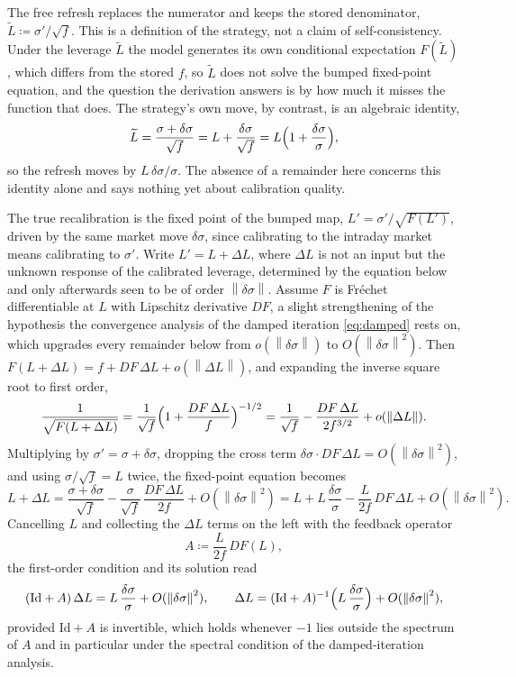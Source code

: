 \documentclass[11pt,a4paper]{article}
\theoremstyle{plain}
\theoremstyle{definition}
\theoremstyle{definition}
\newcommand{\norm}[1]{\left\lVert #1 \right\rVert}
\newcommand{\Lev}{L}
\newcommand{\Id}{\mathrm{Id}}
\begin{document}
The free refresh replaces the numerator and keeps the stored denominator, $\widetilde{\Lev} \coloneqq \sigma'/\sqrt{f}$. This is a definition of the strategy, not a claim of self-consistency. Under the leverage $\widetilde{\Lev}$ the model generates its own conditional expectation $F(\widetilde{\Lev})$, which differs from the stored $f$, so $\widetilde{\Lev}$ does not solve the bumped fixed-point equation, and the question the derivation answers is by how much it misses the function that does. The strategy's own move, by contrast, is an algebraic identity,
\[
  \widetilde{\Lev} = \frac{\sigma + \delta\sigma}{\sqrt{f}} = \Lev + \frac{\delta\sigma}{\sqrt{f}} = \Lev\Bigl(1 + \frac{\delta\sigma}{\sigma}\Bigr),
\]
so the refresh moves by $\Lev\,\delta\sigma/\sigma$. The absence of a remainder here concerns this identity alone and says nothing yet about calibration quality.

The true recalibration is the fixed point of the bumped map, $\Lev' = \sigma'/\sqrt{F(\Lev')}$, driven by the same market move $\delta\sigma$, since calibrating to the intraday market means calibrating to $\sigma'$. Write $\Lev' = \Lev + \Delta\Lev$, where $\Delta\Lev$ is not an input but the unknown response of the calibrated leverage, determined by the equation below and only afterwards seen to be of order $\norm{\delta\sigma}$. Assume $F$ is Fr\'echet differentiable at $\Lev$ with Lipschitz derivative $DF$, a slight strengthening of the hypothesis the convergence analysis of the damped iteration \cref{eq:damped} rests on, which upgrades every remainder below from $o(\norm{\delta\sigma})$ to $O(\norm{\delta\sigma}^2)$. Then $F(\Lev + \Delta\Lev) = f + DF\,\Delta\Lev + o(\norm{\Delta\Lev})$, and expanding the inverse square root to first order,
\[
  \frac{1}{\sqrt{F(\Lev + \Delta\Lev)}}
  = \frac{1}{\sqrt{f}}\Bigl(1 + \frac{DF\,\Delta\Lev}{f}\Bigr)^{-1/2}
  = \frac{1}{\sqrt{f}} - \frac{DF\,\Delta\Lev}{2 f^{3/2}} + o(\norm{\Delta\Lev}) .
\]
Multiplying by $\sigma' = \sigma + \delta\sigma$, dropping the cross term $\delta\sigma \cdot DF\,\Delta\Lev = O(\norm{\delta\sigma}^2)$, and using $\sigma/\sqrt{f} = \Lev$ twice, the fixed-point equation becomes
\[
  \Lev + \Delta\Lev
  = \frac{\sigma + \delta\sigma}{\sqrt{f}} - \frac{\sigma}{\sqrt{f}}\,\frac{DF\,\Delta\Lev}{2f} + O(\norm{\delta\sigma}^2)
  = \Lev + \Lev\,\frac{\delta\sigma}{\sigma} - \frac{\Lev}{2f}\,DF\,\Delta\Lev + O(\norm{\delta\sigma}^2) .
\]
Cancelling $\Lev$ and collecting the $\Delta\Lev$ terms on the left with the feedback operator
\[
  A \coloneqq \frac{\Lev}{2f}\,DF(\Lev),
\]
the first-order condition and its solution read
\begin{equation}\label{eq:truemove}
  (\Id + A)\,\Delta\Lev = \Lev\,\frac{\delta\sigma}{\sigma} + O(\norm{\delta\sigma}^2),
  \qquad
  \Delta\Lev = (\Id + A)^{-1}\Bigl(\Lev\,\frac{\delta\sigma}{\sigma}\Bigr) + O(\norm{\delta\sigma}^2),
\end{equation}
provided $\Id + A$ is invertible, which holds whenever $-1$ lies outside the spectrum of $A$ and in particular under the spectral condition of the damped-iteration analysis.
\end{document}
